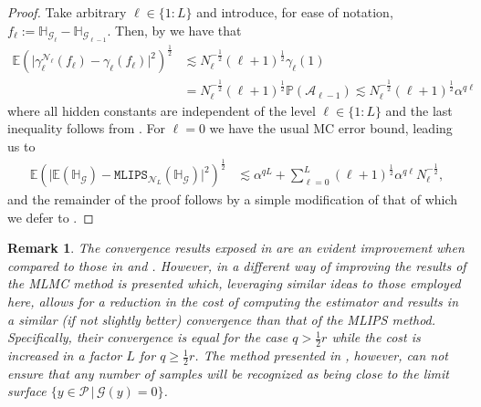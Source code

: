 \documentclass{article}
\newtheorem{remark}[theorem]{Remark}
\newcommand{\cA}{\mathcal{A}}
\newcommand{\cG}{\mathcal{G}}
\newcommand{\cP}{\mathcal{P}}
\newcommand{\cN}{\mathcal{N}}
\newcommand{\IE}{\mathbb{E}}
\newcommand{\IH}{\mathbb{H}}
\newcommand{\IP}{\mathbb{P}}
\newcommand{\IR}{\mathbb{R}}
\newcommand{\norm}[2]{{\left\Vert #2 \right\Vert}_{#1}}
\newcommand{\lp}[2]{{L}^{#1}( #2 )}
\newcommand{\probspacesum}{\cP}
\newcommand{\mlmk}[2]{\mathtt{MLIPS}_{#1}{\left(#2\right)}}
\theoremstyle{definition}
\begin{document}
\begin{proof}
  Take arbitrary $\ell\in\{1:L\}$ and introduce, for ease of notation, $f_\ell:=\IH_{\cG_\ell}-\IH_{\cG_{\ell-1}}$. Then, by  we have that
  \begin{align*}
    \IE\left(\vert\gamma^{\cN_\ell}_\ell(f_\ell)-\gamma_\ell(f_\ell)\vert^2 \right)^\frac{1}{2}
    &\lesssim N_\ell^{-\frac{1}{2}}(\ell+1)^{\frac{1}{2}}\gamma_\ell(1)\\
    &= N_\ell^{-\frac{1}{2}}(\ell+1)^{\frac{1}{2}}\IP(\cA_{\ell-1})
      \lesssim N_\ell^{-\frac{1}{2}}(\ell+1)^{\frac{1}{2}}\alpha^{q\ell}
  \end{align*}
  where all hidden constants are independent of the level $\ell\in\{1:L\}$ and the last inequality follows from . For $\ell=0$ we have the usual MC error bound, leading us to
  \begin{align*}
    \IE\left(\vert\IE(\IH_{\cG})-\mlmk{\cN_L}{\IH_{\cG}}\vert^2\right)^{\frac{1}{2}}&\lesssim\alpha^{qL}+
    \sum\limits_{\ell=0}^L(\ell+1)^{\frac{1}{2}}\alpha^{q\ell}N_{\ell}^{-\frac{1}{2}},
  \end{align*}
  and the remainder of the proof follows by a simple modification of that of \cite[Thm.~1]{cliffeMultilevelMonteCarlo2011} which we defer to .
\end{proof}

\begin{remark}
  The convergence results exposed in  are an evident improvement when compared to
  those in  and . However, in
  \cite{elfversonMultilevelMonteCarlo2016} a different way of improving the results of the MLMC
  method is presented which, leveraging similar ideas to those employed here, allows for a reduction
  in the cost of computing the estimator and results in a similar (if not slightly better)
  convergence than that of the MLIPS method. Specifically, their convergence is equal for the case
  $q>\frac{1}{2}r$ while the cost is increased in a factor $L$ for $q\geq\frac{
    1}{2}r$. The method
  presented in \cite{elfversonMultilevelMonteCarlo2016}, however, can not ensure that any number of
  samples will be recognized as being close to the limit surface $\{y\in\cP\,\vert\,\cG(y)=0\}$.
\end{remark}
\end{document}
